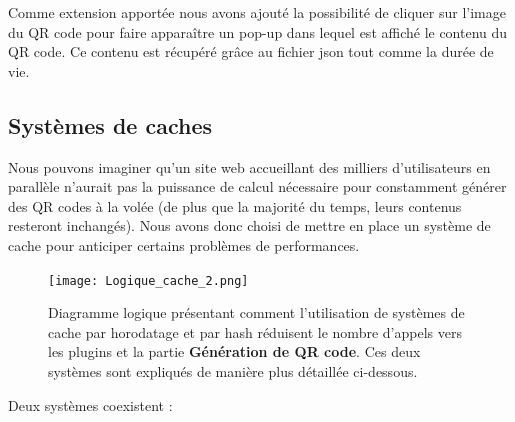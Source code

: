 \documentclass[a4paper,12pt]{article}
\begin{document}
\noindent Comme extension apportée nous avons ajouté la possibilité de cliquer sur l'image du QR code pour faire apparaître un pop-up dans lequel est affiché le contenu du QR code. Ce contenu est récupéré grâce au fichier json tout comme la durée de vie.


\subsection{Systèmes de caches}
\label{systemesCaches}

Nous pouvons imaginer qu'un site web accueillant des milliers d'utilisateurs en parallèle n'aurait pas la puissance de calcul nécessaire pour constamment générer des QR codes à la volée (de plus que la majorité du temps, leurs contenus resteront inchangés). Nous avons donc choisi de mettre en place un système de cache pour anticiper certains problèmes de performances.


\begin{figure}[H]
    \centering
    \texttt{[image: Logique\_cache\_2.png]}
    \caption{Diagramme logique présentant comment l'utilisation de systèmes de cache par horodatage et par hash réduisent le nombre d'appels vers les plugins et la partie \textbf{Génération de QR code}. Ces deux systèmes sont expliqués de manière plus détaillée ci-dessous.}
\end{figure}

Deux systèmes coexistent :\\
\end{document}
